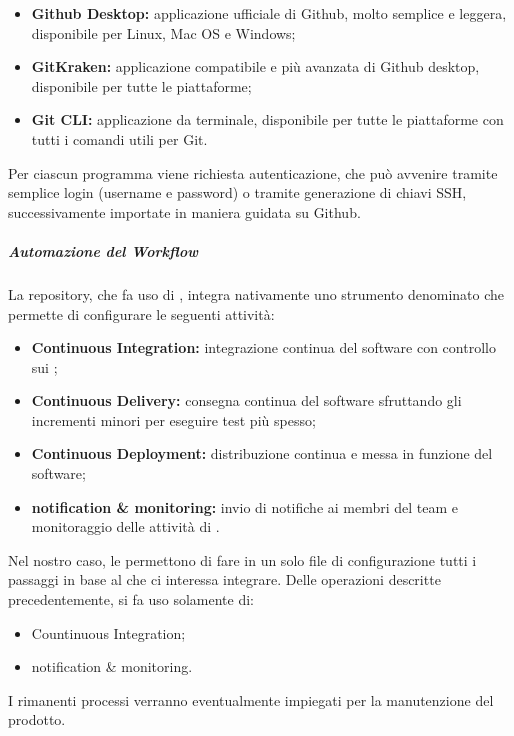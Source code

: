 		\begin{itemize}
			\item \textbf{Github Desktop:} applicazione ufficiale di Github, molto semplice e leggera, disponibile per Linux, Mac OS e Windows;
			\item \textbf{GitKraken:} applicazione compatibile e più avanzata di Github desktop, disponibile per tutte le piattaforme;
			\item \textbf{Git CLI:} applicazione da terminale, disponibile per tutte le piattaforme con tutti i comandi utili per Git.
		\end{itemize}

		Per ciascun programma viene richiesta autenticazione, che può avvenire tramite semplice login (username e password) o tramite generazione di chiavi SSH, successivamente importate in maniera guidata su Github.

		\subparagraph{Automazione del Workflow}

		La repository, che fa uso di , integra nativamente uno strumento denominato  che permette di configurare le seguenti attività:
		\begin{itemize}
			\item \textbf{Continuous Integration:} integrazione continua del software con controllo sui ;
			\item \textbf{Continuous Delivery:} consegna continua del software sfruttando gli incrementi minori per eseguire test più spesso;
			\item \textbf{Continuous Deployment:} distribuzione continua e messa in funzione del software;
			\item \textbf{notification \& monitoring:} invio di notifiche ai membri del team e monitoraggio delle attività di .
		\end{itemize}

		Nel nostro caso, le  permettono di fare in un solo file di configurazione tutti i passaggi in base al  che ci interessa integrare. 
		\newline
		Delle operazioni descritte precedentemente, si fa uso solamente di:
		\begin{itemize}
			\item Countinuous Integration;
			\item notification \& monitoring.
		\end{itemize}
		I rimanenti processi verranno eventualmente impiegati per la manutenzione del prodotto.

